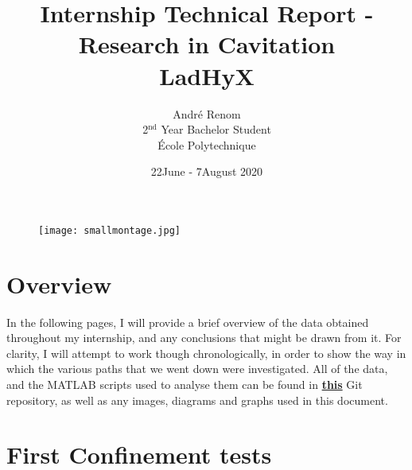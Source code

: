 \documentclass{article}
\title{Internship Technical Report - Research in Cavitation\\LadHyX}
\date{22\nd June - 7\thh August 2020}
\author{Andr\'e Renom\\2$^{\text{nd}}$ Year Bachelor Student\\ \'Ecole Polytechnique}
\begin{document}
	\maketitle

\begin{figure}[H]
    \centering
    \texttt{[image: smallmontage.jpg]}
\end{figure}
\tableofcontents
\newpage
{}
\section{Overview}
In the following pages, I will provide a brief overview of the data obtained throughout my internship, and any conclusions that might be drawn from it. For clarity, I will attempt to work though chronologically, in order to show the way in which the various paths that we went down were investigated. All of the data, and the MATLAB scripts used to analyse them can be found in \href{https://github.com/ARenomX/Cavitation}{\textbf{this}} Git repository, as well as any images, diagrams and graphs used in this document.

\section{First Confinement tests}
\end{document}
